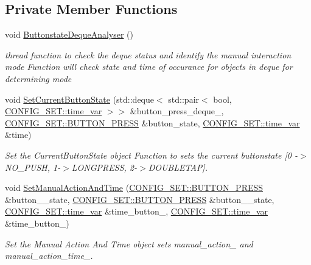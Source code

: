 \subsection*{Private Member Functions}
\begin{DoxyCompactItemize}
\item 
void \hyperlink{classManualInteraction_a7347f8414fc849ab263b3d717add9484}{Buttonstate\+Deque\+Analyser} ()
\begin{DoxyCompactList}\small\item\em thread function to check the deque status and identify the manual interaction mode Function will check state and time of occurance for objects in deque for determining mode \end{DoxyCompactList}\item 
void \hyperlink{classManualInteraction_afce55b16a04782daf03a62477d3120ba}{Set\+Current\+Button\+State} (std\+::deque$<$ std\+::pair$<$ bool, \hyperlink{namespaceCONFIG__SET_a8816a22e7885d027a52bfa0d24fa9008}{C\+O\+N\+F\+I\+G\+\_\+\+S\+E\+T\+::time\+\_\+var} $>$$>$ \&button\+\_\+press\+\_\+deque\+\_\+, \hyperlink{namespaceCONFIG__SET_a94751f576b4a29d791e7871295c48b72}{C\+O\+N\+F\+I\+G\+\_\+\+S\+E\+T\+::\+B\+U\+T\+T\+O\+N\+\_\+\+P\+R\+E\+SS} \&button\+\_\+state, \hyperlink{namespaceCONFIG__SET_a8816a22e7885d027a52bfa0d24fa9008}{C\+O\+N\+F\+I\+G\+\_\+\+S\+E\+T\+::time\+\_\+var} \&time)
\begin{DoxyCompactList}\small\item\em Set the Current\+Button\+State object Function to sets the current buttonstate \mbox{[}0 -\/$>$N\+O\+\_\+\+P\+U\+SH, 1-\/$>$L\+O\+N\+G\+P\+R\+E\+SS, 2-\/$>$D\+O\+U\+B\+L\+E\+T\+AP\mbox{]}. \end{DoxyCompactList}\item 
void \hyperlink{classManualInteraction_afb8fd56c9e56af41d3dfad489fac7a4b}{Set\+Manual\+Action\+And\+Time} (\hyperlink{namespaceCONFIG__SET_a94751f576b4a29d791e7871295c48b72}{C\+O\+N\+F\+I\+G\+\_\+\+S\+E\+T\+::\+B\+U\+T\+T\+O\+N\+\_\+\+P\+R\+E\+SS} \&button\+\_\+\_\+state, \hyperlink{namespaceCONFIG__SET_a94751f576b4a29d791e7871295c48b72}{C\+O\+N\+F\+I\+G\+\_\+\+S\+E\+T\+::\+B\+U\+T\+T\+O\+N\+\_\+\+P\+R\+E\+SS} \&button\+\_\+\_\+state, \hyperlink{namespaceCONFIG__SET_a8816a22e7885d027a52bfa0d24fa9008}{C\+O\+N\+F\+I\+G\+\_\+\+S\+E\+T\+::time\+\_\+var} \&time\+\_\+button\+\_, \hyperlink{namespaceCONFIG__SET_a8816a22e7885d027a52bfa0d24fa9008}{C\+O\+N\+F\+I\+G\+\_\+\+S\+E\+T\+::time\+\_\+var} \&time\+\_\+button\+\_)
\begin{DoxyCompactList}\small\item\em Set the Manual Action And Time object sets manual\+\_\+action\+\_\+ and manual\+\_\+action\+\_\+time\+\_\+. \end{DoxyCompactList}\end{DoxyCompactItemize}
